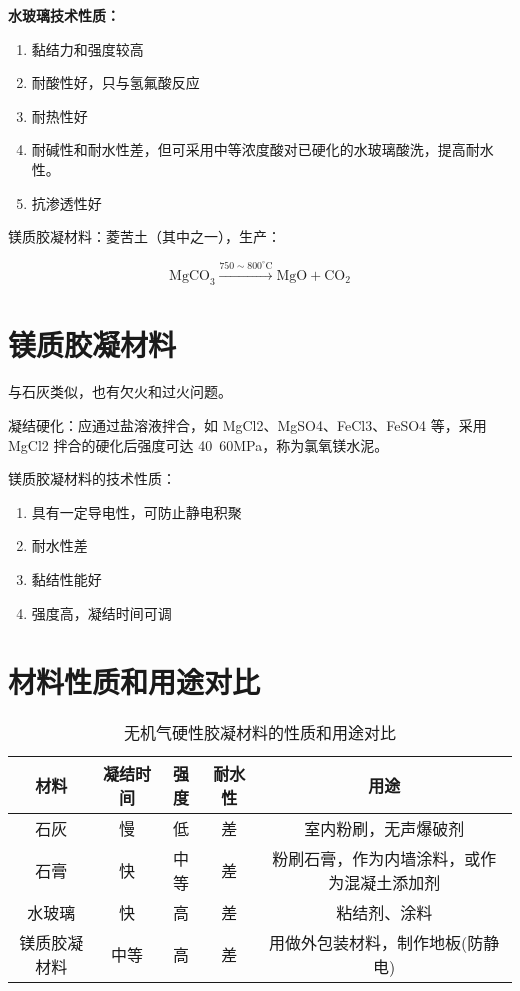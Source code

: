 \documentclass[12pt, a4paper, oneside, UTF8]{ctexbook}
\begin{document}
\textbf{水玻璃技术性质：}
\begin{enumerate}
    \item 黏结力和强度较高
    \item 耐酸性好，只与氢氟酸反应\
    \item 耐热性好
    \item 耐碱性和耐水性差，但可采用中等浓度酸对已硬化的水玻璃酸洗，提高耐水性。
    \item 抗渗透性好
\end{enumerate}

镁质胶凝材料：菱苦土（其中之一），生产：

\[
\text{MgCO}_3 \xrightarrow{750 \sim 800^\circ \text{C}} \text{MgO} + \text{CO}_2
\]

\section{镁质胶凝材料}

与石灰类似，也有欠火和过火问题。

凝结硬化：应通过盐溶液拌合，如 MgCl2、MgSO4、FeCl3、FeSO4 等，采用 MgCl2 拌合的硬化后强度可达 40~60MPa，称为氯氧镁水泥。

镁质胶凝材料的技术性质：

\begin{enumerate}
    \item 具有一定导电性，可防止静电积聚
    \item 耐水性差
    \item 黏结性能好
    \item 强度高，凝结时间可调
\end{enumerate}

\section{材料性质和用途对比}

\begin{table}[ht]
    \centering
    \begin{tabular}{|c|c|c|c|c|}
        \hline
        \textbf{材料} & \textbf{凝结时间} & \textbf{强度} & \textbf{耐水性} & \textbf{用途} \\ \hline
        石灰 & 慢 & 低 & 差 & 室内粉刷，无声爆破剂 \\ \hline
        石膏 & 快 & 中等 & 差 & 粉刷石膏，作为内墙涂料，或作为混凝土添加剂 \\ \hline
        水玻璃 & 快 & 高 & 差 & 粘结剂、涂料 \\ \hline
        镁质胶凝材料 & 中等 & 高 & 差 & 用做外包装材料，制作地板(防静电) \\ \hline
    \end{tabular}
    \caption{无机气硬性胶凝材料的性质和用途对比}
\end{table}
\end{document}
